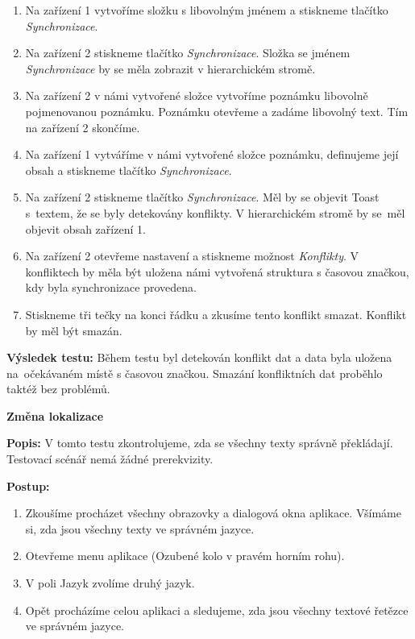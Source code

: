 \documentclass[czech, bc, kiv, he, iso690numb]{fasthesis}
\begin{document}
\begin{enumerate}[label=\arabic*., itemsep=0pt, topsep=0pt, parsep=0pt]
    \item Na zařízení 1 vytvoříme složku s libovolným jménem a stiskneme tlačítko \textit{Synchronizace}.
    \item Na zařízení 2 stiskneme tlačítko \textit{Synchronizace}. Složka se jménem \textit{Synchronizace} by se měla zobrazit v hierarchickém stromě.
    \item Na zařízení 2 v námi vytvořené složce vytvoříme poznámku libovolně pojmenovanou poznámku. Poznámku otevřeme a zadáme libovolný text. Tím na zařízení 2 skončíme.
    \item Na zařízení 1 vytváříme v námi vytvořené složce poznámku, definujeme její obsah a stiskneme tlačítko \textit{Synchronizace}.
    \item Na zařízení 2 stiskneme tlačítko \textit{Synchronizace}. Měl by se objevit Toast s~textem, že se byly detekovány konflikty. V hierarchickém stromě by se~měl objevit obsah zařízení 1.
    \item Na zařízení 2 otevřeme nastavení a stiskneme možnost \textit{Konflikty}. V konfliktech by měla být uložena námi vytvořená struktura s časovou značkou, kdy byla synchronizace provedena.
    \item Stiskneme tři tečky na konci řádku a zkusíme tento konflikt smazat. Konflikt by měl být smazán.
\end{enumerate}

\noindent \textbf{Výsledek testu:} Během testu byl detekován konflikt dat a data byla uložena na~očekávaném místě s časovou značkou. Smazání konfliktních dat proběhlo taktéž bez problémů. 

\vspace{0.1cm}


\noindent \textbf{Změna lokalizace}

\vspace{0.1cm}

\noindent \textbf{Popis:} V tomto testu zkontrolujeme, zda se všechny texty správně překládají. Testovací scénář nemá žádné prerekvizity.

\vspace{0.1cm}

\noindent \textbf{Postup:}

\begin{enumerate}[label=\arabic*., itemsep=0pt, topsep=0pt, parsep=0pt]
    \item Zkoušíme procházet všechny obrazovky a dialogová okna aplikace. Všímáme si, zda jsou všechny texty ve správném jazyce.
    \item Otevřeme menu aplikace (Ozubené kolo v pravém horním rohu).
    \item V poli Jazyk zvolíme druhý jazyk.
    \item Opět procházíme celou aplikaci a sledujeme, zda jsou všechny textové řetězce ve správném jazyce.
\end{enumerate}
\end{document}
